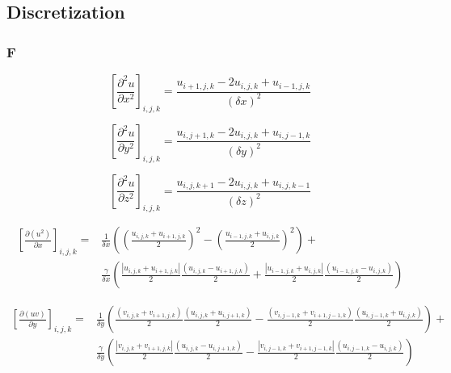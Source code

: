 \documentclass[10pt]{article}
\begin{document}
\subsection{Discretization}
\subsubsection{F}

\begin{equation}
\left[\frac{\partial^2 u}{\partial x^2}\right]_{i,j,k} =
\frac{u_{i+1,j,k} - 2u_{i,j,k} + u_{i-1,j,k}}{(\delta x)^2}
\end{equation}

\begin{equation}
\left[\frac{\partial^2 u}{\partial y^2}\right]_{i,j,k} =
\frac{u_{i,j+1,k} - 2u_{i,j,k} + u_{i,j-1,k}}{(\delta y)^2}
\end{equation}

\begin{equation}
\left[\frac{\partial^2 u}{\partial z^2}\right]_{i,j,k} =
\frac{u_{i,j,k+1} - 2u_{i,j,k} + u_{i,j,k-1}}{(\delta z)^2}
\end{equation}

\begin{equation}
\begin{split}
\left[\frac{\partial(u^2)}{\partial x}\right]_{i,j,k} = &
\frac{1}{\delta x}
\left(
	\left(\frac{u_{i,j,k}+u_{i+1,j,k}}{2}\right)^2 -
	\left(\frac{u_{i-1,j,k}+u_{i,j,k}}{2}\right)^2
\right) + \\
& \frac{\gamma}{\delta x}
\left(
	\frac{|u_{i,j,k}+u_{i+1,j,k}|}{2} \frac{(u_{i,j,k}-u_{i+1,j,k})}{2} +
	\frac{|u_{i-1,j,k}+u_{i,j,k}|}{2} \frac{(u_{i-1,j,k}-u_{i,j,k})}{2}
\right)
\end{split}
\end{equation}

\begin{equation}
\begin{split}
\left[\frac{\partial(uv)}{\partial y}\right]_{i,j,k} = &
\frac{1}{\delta y}
\left(
	\frac{(v_{i,j,k}+v_{i+1,j,k})}{2} \frac{(u_{i,j,k}+u_{i,j+1,k})}{2} -
	\frac{(v_{i,j-1,k}+v_{i+1,j-1,k})}{2} \frac{(u_{i,j-1,k}+u_{i,j,k})}{2}
\right) + \\
& \frac{\gamma}{\delta y}
\left(
	\frac{|v_{i,j,k}+v_{i+1,j,k}|}{2} \frac{(u_{i,j,k}-u_{i,j+1,k})}{2} -
	\frac{|v_{i,j-1,k}+v_{i+1,j-1,k}|}{2} \frac{(u_{i,j-1,k}-u_{i,j,k})}{2}
\right)
\end{split}
\end{equation}
\end{document}
